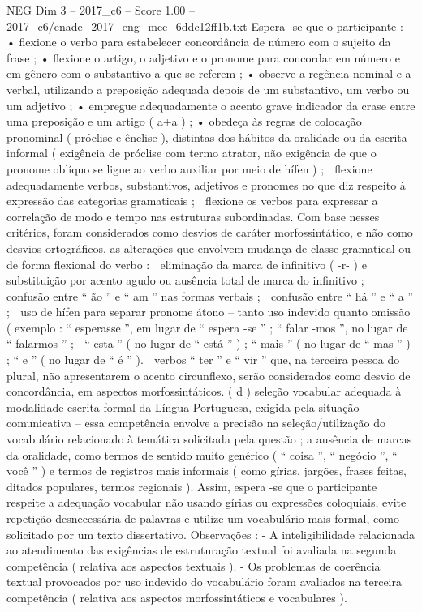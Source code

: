 \begin{textsample}{NEG Dim 3 – 2017\_c6 – Score 1.00 – 2017\_c6/enade\_2017\_eng\_mec\_6ddc12ff1b.txt}
Espera -se que o participante : • flexione o verbo para estabelecer concordância de número com o sujeito da frase ; • flexione o artigo, o adjetivo e o pronome para concordar em número e em gênero com o substantivo a que se referem ; • observe a regência nominal e a verbal, utilizando a preposição adequada depois de um substantivo, um verbo ou um adjetivo ; • empregue adequadamente o acento grave indicador da crase entre uma preposição e um artigo ( a+a ) ; • obedeça às regras de colocação pronominal ( próclise e ênclise ), distintas dos hábitos da oralidade ou da escrita informal ( exigência de próclise com termo atrator, não exigência de que o pronome oblíquo se ligue ao verbo auxiliar por meio de hífen ) ;  flexione adequadamente verbos, substantivos, adjetivos e pronomes no que diz respeito à expressão das categorias gramaticais ;  flexione os verbos para expressar a correlação de modo e tempo nas estruturas subordinadas.
Com base nesses critérios, foram considerados como desvios de caráter morfossintático, e não como desvios ortográficos, as alterações que envolvem mudança de classe gramatical ou de forma flexional do verbo :  eliminação da marca de infinitivo ( -r- ) e substituição por acento agudo ou ausência total de marca do infinitivo ;  confusão entre “ ão ” e “ am ” nas formas verbais ;  confusão entre “ há ” e “ a ” ;  uso de hífen para separar pronome átono – tanto uso indevido quanto omissão ( exemplo : “ esperasse ”, em lugar de “ espera -se ” ; “ falar -mos ”, no lugar de “ falarmos ” ;  “ esta ” ( no lugar de “ está ” ) ; “ mais ” ( no lugar de “ mas ” ) ; “ e ” ( no lugar de “ é ” ).  verbos “ ter ” e “ vir ” que, na terceira pessoa do plural, não apresentarem o acento circunflexo, serão considerados como desvio de concordância, em aspectos morfossintáticos. ( d ) seleção vocabular adequada à modalidade escrita formal da Língua Portuguesa, exigida pela situação comunicativa – essa competência envolve a precisão na seleção/utilização do vocabulário relacionado à temática solicitada pela questão ; a ausência de marcas da oralidade, como termos de sentido muito genérico ( “ coisa ”, “ negócio ”, “ você ” ) e termos de registros mais informais ( como gírias, jargões, frases feitas, ditados populares, termos regionais ).
Assim, espera -se que o participante respeite a adequação vocabular não usando gírias ou expressões coloquiais, evite repetição desnecessária de palavras e utilize um vocabulário mais formal, como solicitado por um texto dissertativo.
Observações : - A inteligibilidade relacionada ao atendimento das exigências de estruturação textual foi avaliada na segunda competência ( relativa aos aspectos textuais ). - Os problemas de coerência textual provocados por uso indevido do vocabulário foram avaliados na terceira competência ( relativa aos aspectos morfossintáticos e vocabulares ).

\end{textsample}
